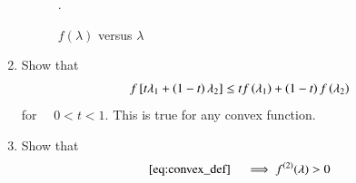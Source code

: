 \begin{enumerate}[label=\arabic*.,ref=\thesection.\theenumi]
\begin{figure}[!ht]
\caption{ $f(\lambda)$ versus $\lambda$}.
\label{fig:conv_def}	
\end{figure}
%
\item Show that
%
\begin{align}
\label{eq:convex_def}
f{}\left[t \lambda_1 + \left(1-t\right)\lambda_2\right] \leq 
t f\left(\lambda_1\right) + \left(1-t\right)f\left(\lambda_2\right)
\end{align}
%
for $\quad 0 < t < 1$.  This is true for any convex function.
%
\item Show that 
%
\begin{equation}
\eqref{eq:convex_def} \quad \implies f^{(2)}(\lambda) > 0
\end{equation}

%
\end{enumerate}
%
